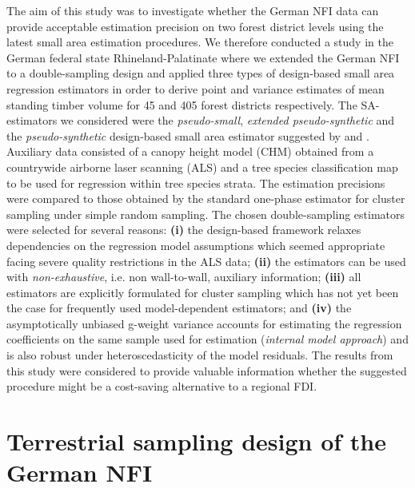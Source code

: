 \documentclass[remotesensing,article,submit,moreauthors,pdftex,10pt,a4paper]{mdpi}
\begin{document}
The aim of this study was to investigate whether the German NFI data can provide acceptable estimation precision on two forest district levels using the latest small area estimation procedures. We therefore conducted a study in the German federal state Rhineland-Palatinate where we extended the German NFI to a double-sampling design and applied three types of design-based small area regression estimators in order to derive point and variance estimates of mean standing timber volume for 45 and 405 forest districts respectively. The SA-estimators we considered were the \textit{pseudo-small}, \textit{extended pseudo-synthetic} and the \textit{pseudo-synthetic} design-based small area estimator suggested by \citet{mandallaz2013a} and \citet{ mandallaz2013b}. Auxiliary data consisted of a canopy height model (CHM) obtained from a countrywide airborne laser scanning (ALS) and a tree species classification map to be used for regression within tree species strata. The estimation precisions were compared to those obtained by the standard one-phase estimator for cluster sampling under simple random sampling. The chosen double-sampling estimators were selected for several reasons: \textbf{(i)} the design-based framework relaxes dependencies on the regression model assumptions which seemed appropriate facing severe quality restrictions in the ALS data; \textbf{(ii)} the estimators can be used with \textit{non-exhaustive}, i.e. non wall-to-wall, auxiliary information; \textbf{(iii)} all estimators are explicitly formulated for cluster sampling which has not yet been the case for frequently used model-dependent estimators; and \textbf{(iv)} the asymptotically unbiased g-weight variance accounts for estimating the regression coefficients on the same sample used for estimation (\textit{internal model approach}) and is also robust under heteroscedasticity of the model residuals. The results from this study were considered to provide valuable information whether the suggested procedure might be a cost-saving alternative to a regional FDI.\par


\section{Terrestrial sampling design of the German NFI}
\label{sec:germanNFI}
\end{document}
